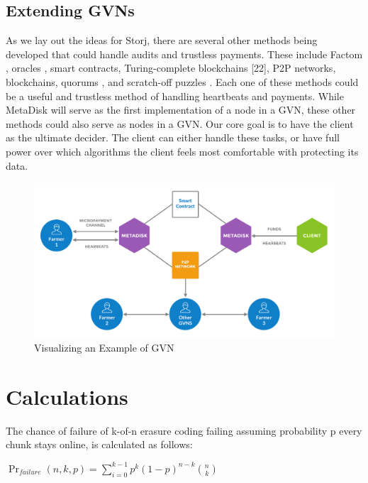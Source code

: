\documentclass[a4paper,10pt]{article}
\begin{document}
\subsection{Extending GVNs}
As we lay out the ideas for Storj, there are several other methods being developed that could handle audits and trustless payments. These include Factom \cite{7}, oracles \cite{21}, smart contracts, Turing-complete blockchains [22], P2P networks, blockchains, quorums \cite{20}, and scratch-off puzzles \cite{23}. Each one of these methods could be a useful and trustless method of handling heartbeats and payments. While MetaDisk \cite{1} will serve as the first implementation of a node in a GVN, these other methods could also serve as nodes in a GVN. Our core goal is to have the client as the ultimate decider. The client can either handle these tasks, or have full power over which algorithms the client feels most comfortable with protecting its data. 

\begin{figure}[h!]
\centering
\includegraphics[width=\linewidth]{9}
\caption{Visualizing an Example of GVN}
\end{figure}

\section{Calculations}
The chance of failure of k-of-n erasure coding failing assuming probability p every chunk stays online, is calculated as follows:

{\centering
$\Pr_{failure}(n,k,p) = \displaystyle \sum_{i=0}^{k-1} p^{k}(1-p)^{n-k }{n \choose k}$
\\}
\end{document}

